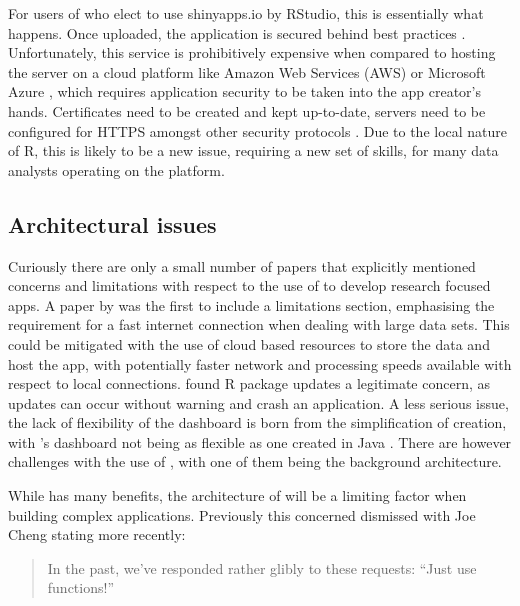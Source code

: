 For users of  who elect to use shinyapps.io by RStudio, this is essentially what happens. Once uploaded, the application is secured behind best practices \citep{core_team_rstudio_2012}. Unfortunately, this service is prohibitively expensive when compared to hosting the server on a cloud platform like Amazon Web Services (AWS) \citep{amazon_amazon_2019} or Microsoft Azure \citep{microsoft_pricing_2019}, which requires application security to be taken into the app creator's hands. Certificates need to be created and kept up-to-date, servers need to be configured for HTTPS amongst other security protocols \citep{charpentier_web_2013}.  Due to the local nature of R, this is likely to be a new issue, requiring a new set of skills, for many data analysts operating on the platform.

\subsection{Architectural issues}

Curiously there are only a small number of papers that explicitly mentioned concerns and limitations with respect to the use of  to develop research focused apps.  A paper by \citet{dwivedi_shinygispa_2018} was the first to include a limitations section, emphasising the requirement for a fast internet connection when dealing with large data sets.  This could be mitigated with the use of cloud based resources to store the data and host the app, with potentially faster network and processing speeds available with respect to local connections. \citet{guo_developing_2018} found R package updates a legitimate concern, as updates can occur without warning and crash an application.  A less serious issue, the lack of flexibility of the dashboard is born from the simplification of creation, with 's dashboard not being as flexible as one created in Java \citep{ge_idep_2018}.  There are however challenges with the use of , with one of them being the background architecture.

While  has many benefits, the architecture of  will be a limiting factor when building complex applications.  Previously this concerned dismissed with Joe Cheng stating more recently:

\begin{quotation}
	In the past, we’ve responded rather glibly to these requests: “Just use functions!” \citep{cheng_shiny_2019}
\end{quotation}

